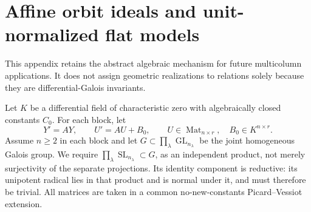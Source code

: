 \documentclass[11pt]{article}
\numberwithin{equation}{section}
\theoremstyle{definition}
\theoremstyle{remark}
\newcommand{\SL}{\operatorname{SL}}
\newcommand{\GL}{\operatorname{GL}}
\begin{document}
\appendix
\section{Affine orbit ideals and unit-normalized flat models}
\label{app:affine-orbits}
This appendix retains the abstract algebraic mechanism for future
multicolumn applications. It does not assign geometric realizations to
relations solely because they are differential-Galois invariants.

Let $K$ be a differential field of characteristic zero with algebraically
closed constants $C_0$. For each block, let
\[
 Y'=AY,\qquad U'=AU+B_0,
 \qquad U\in\operatorname{Mat}_{n\times r},\quad B_0\in K^{n\times r}.
\]
Assume $n\ge2$ in each block and let
$G\subset\prod_\lambda\GL_{n_\lambda}$ be the joint homogeneous
Galois group. We require
$\prod_\lambda\SL_{n_\lambda}\subset G$, as an independent product,
not merely surjectivity of the separate projections. Its identity
component is reductive: its unipotent radical lies in that product and
is normal under it, and must therefore be trivial. All matrices are
taken in a common no-new-constants Picard--Vessiot extension.
\end{document}
